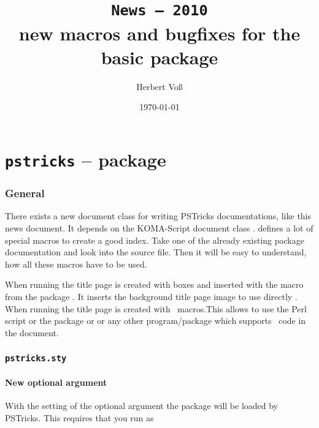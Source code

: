 \documentclass[11pt,english,BCOR=10mm,DIV12,bibliography=totoc,parskip=false,headings=small,,
    headinclude=false,footinclude=false,oneside]{pst-doc}
\let\Lfile\LFile
\begin{document}
\title{\texttt{News -- 2010}\\ \Large new macros and bugfixes for the
basic package }
\author{Herbert Voß}
\date{\today}

\maketitle

\clearpage
\tableofcontents

\clearpage
\part{\texttt{pstricks} -- package}

\section{General}
There exists a new document class  for writing PSTricks documentations,
like this news document. It depends on the KOMA-Script document class .
 defines a lot of special macros to create a good index. Take one of
the already existing package documentation and look into the source file. Then it will be
easy to understand, how all these macros have to be used.

When running  the title page is created with boxes and inserted 
with the macro  from the package . It
inserts the background title page image \Lfile{pst-doc-pdf} to use directly
.
When running  the title page
 is created with \PST\ macros.This allows to use the Perl script  or
the package  or  or any other program/package which
supports \PS\ code in the document.


\section{\texttt{pstricks.sty}}
\subsection{New optional argument}

With the setting of the optional argument  the package  will be loaded
by PSTricks. This requires that you run  as 
\end{document}
